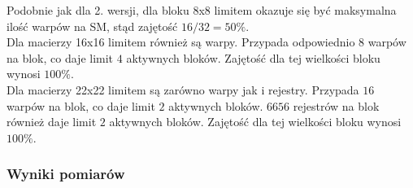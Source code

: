 Podobnie jak dla 2. wersji, dla bloku 8x8 limitem okazuje się być maksymalna ilość warpów na SM, stąd zajętość $ 16 / 32 = 50\% $. \\
Dla macierzy 16x16 limitem również są warpy. Przypada odpowiednio $ 8 $ warpów na blok, co daje limit $ 4 $ aktywnych bloków. Zajętość dla tej wielkości bloku wynosi $ 100\% $. \\
Dla macierzy 22x22 limitem są zarówno warpy jak i rejestry. Przypada $ 16 $ warpów na blok, co daje limit $ 2 $ aktywnych bloków. $ 6656 $ rejestrów na blok również daje limit $ 2 $ aktywnych bloków. Zajętość dla tej wielkości bloku wynosi $ 100\% $.

\subsubsection{Wyniki pomiarów}

